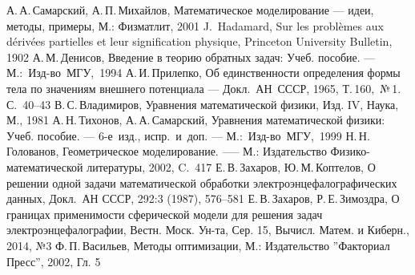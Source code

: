 \documentclass[oneside,final,12pt]{article}
\theoremstyle{definition}
\begin{document}
	
	
	
    \setcounter{page}{2}
	\tableofcontents
	\pagebreak
	
	
	
	
	
	
	
	
	
	
	
	
	
	\newpage
	\begin{thebibliography}{99}
        А.\,А.\,Самарский, А.\,П.\,Михайлов, Математическое моделирование --- идеи, методы, примеры, М.: Физматлит, 2001
        J.\, Hadamard, Sur les problèmes aux dérivées partielles et leur signification physique, Princeton University Bulletin, 1902
        А.\,М.\,Денисов, Введение в теорию обратных задач: Учеб. пособие. ---\\
        М.:~Изд-во~МГУ,~1994
        А.\,И.\,Прилепко, Об единственности определения формы тела по значениям внешнего потенциала --- Докл.~АН~СССР, 1965, Т.\,160,~№\,1. С.~40--43
		В.\,С.\,Владимиров, Уравнения математической физики, Изд. IV, Наука, М., 1981
		А.\,Н.\,Тихонов, А.\,А.\,Самарский, Уравнения математической физики: Учеб. пособие. --- 6-е~изд., испр.~и~доп. --- М.:~Изд-во~МГУ,~1999
		Н.\,Н.\,Голованов, Геометрическое моделирование. --— М.: Издательство Физико-математической литературы, 2002, C.~417
		Е.\,В.\,Захаров, Ю.\,М.\,Коптелов, О решении одной задачи математической обработки электроэнцефалографических данных, Докл.~АН СССР, 292:3 (1987), 576–581
		Е.\,В.\,Захаров, Р.\,Е.\,Зимоздра, О границах применимости сферической модели для решения задач электроэнцефалографии, Вестн. Моск. Ун-та, Сер. 15, Вычисл. Матем. и Киберн., 2014, №3
        Ф.\,П.\,Васильев, Методы оптимизации, М.: Издательство ''Факториал Пресс'', 2002, Гл. 5
	\end{thebibliography}
\end{document}

